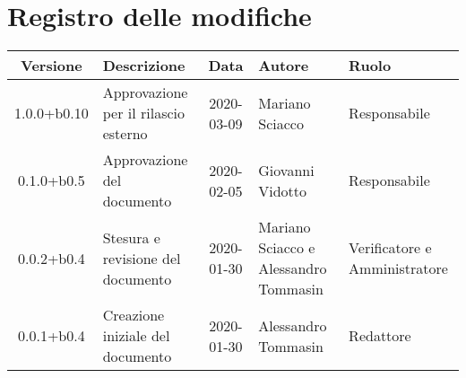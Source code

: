 \section*{Registro delle modifiche}

\begin{center}
	\begin{longtable}{|c|p{3.5cm}|c|p{3cm}|p{3cm}|}
	\hline
	\rowcolor{lighter-grayer}
	\textbf{Versione} & \textbf{Descrizione} & \textbf{Data} & \textbf{Autore} & \textbf{Ruolo} \\
	\hline
	\endfirsthead


	1.0.0+b0.10 & Approvazione per il rilascio esterno & 2020-03-09 & Mariano Sciacco & Responsabile \\
	\hline
	0.1.0+b0.5 & Approvazione del documento & 2020-02-05 & Giovanni Vidotto & Responsabile \\
	\hline
	0.0.2+b0.4 & Stesura e revisione del documento & 2020-01-30 & Mariano Sciacco e Alessandro Tommasin & Verificatore e Amministratore \\
	\hline
	0.0.1+b0.4 & Creazione iniziale del documento & 2020-01-30 & Alessandro Tommasin & Redattore \\
	\hline

	\end{longtable}
\end{center}